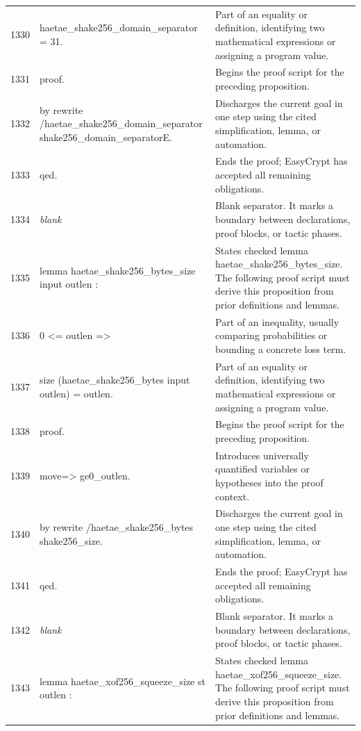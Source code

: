 \documentclass[10pt]{article}
\begin{document}
\begin{longtable}{r L{0.53\textwidth} L{0.37\textwidth}}
1330 & {\ttfamily\scriptsize   haetae\_shake256\_domain\_separator = 31.} & Part of an equality or definition, identifying two mathematical expressions or assigning a program value. \\
1331 & {\ttfamily\scriptsize proof.} & Begins the proof script for the preceding proposition. \\
1332 & {\ttfamily\scriptsize by rewrite /haetae\_shake256\_domain\_separator shake256\_domain\_separatorE.} & Discharges the current goal in one step using the cited simplification, lemma, or automation. \\
1333 & {\ttfamily\scriptsize qed.} & Ends the proof; EasyCrypt has accepted all remaining obligations. \\
1334 & {\ttfamily\scriptsize \emph{blank}} & Blank separator.  It marks a boundary between declarations, proof blocks, or tactic phases. \\
1335 & {\ttfamily\scriptsize lemma haetae\_shake256\_bytes\_size input outlen :} & States checked lemma haetae\_shake256\_bytes\_size.  The following proof script must derive this proposition from prior definitions and lemmas. \\
1336 & {\ttfamily\scriptsize   0 <= outlen =>} & Part of an inequality, usually comparing probabilities or bounding a concrete loss term. \\
1337 & {\ttfamily\scriptsize   size (haetae\_shake256\_bytes input outlen) = outlen.} & Part of an equality or definition, identifying two mathematical expressions or assigning a program value. \\
1338 & {\ttfamily\scriptsize proof.} & Begins the proof script for the preceding proposition. \\
1339 & {\ttfamily\scriptsize move=> ge0\_outlen.} & Introduces universally quantified variables or hypotheses into the proof context. \\
1340 & {\ttfamily\scriptsize by rewrite /haetae\_shake256\_bytes shake256\_size.} & Discharges the current goal in one step using the cited simplification, lemma, or automation. \\
1341 & {\ttfamily\scriptsize qed.} & Ends the proof; EasyCrypt has accepted all remaining obligations. \\
1342 & {\ttfamily\scriptsize \emph{blank}} & Blank separator.  It marks a boundary between declarations, proof blocks, or tactic phases. \\
1343 & {\ttfamily\scriptsize lemma haetae\_xof256\_squeeze\_size st outlen :} & States checked lemma haetae\_xof256\_squeeze\_size.  The following proof script must derive this proposition from prior definitions and lemmas. \\

\end{longtable}
\end{document}
